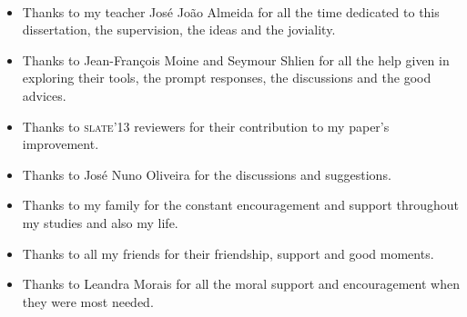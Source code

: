 \paragraph{}

\begin{itemize}
  \item Thanks to my teacher José João Almeida for all the time dedicated to this dissertation, the
  supervision, the ideas and the joviality.
  \item Thanks to Jean-François Moine and Seymour Shlien for all the help given in exploring their
  tools, the prompt responses, the discussions and the good advices.
  \item Thanks to \textsc{slate'13} reviewers for their contribution to my
  paper's~\cite{Azevedo2013} improvement.
  \item Thanks to José Nuno Oliveira for the discussions and suggestions.
  \item Thanks to my family for the constant encouragement and support throughout my studies and
  also my life.
  \item Thanks to all my friends for their friendship, support and good moments.
  \item Thanks to Leandra Morais for all the moral support and encouragement when they were most
  needed.
\end{itemize}
